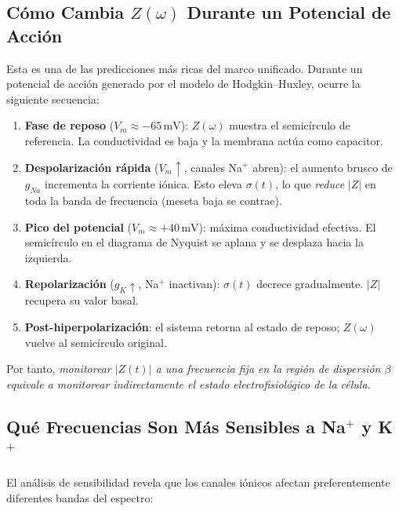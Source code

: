 \documentclass[12pt]{article}
\begin{document}
\subsection{C\'omo Cambia $Z(\omega)$ Durante un Potencial de Acci\'on}

Esta es una de las predicciones m\'as ricas del marco unificado. Durante un potencial de
acci\'on generado por el modelo de Hodgkin--Huxley, ocurre la siguiente secuencia:

\begin{enumerate}
\item \textbf{Fase de reposo} ($V_m \approx -65\,\text{mV}$): $Z(\omega)$ muestra el
semic\'irculo de referencia. La conductividad es baja y la membrana act\'ua como capacitor.
\item \textbf{Despolarizaci\'on r\'apida} ($V_m \uparrow$, canales Na$^+$ abren): el aumento
brusco de $g_{Na}$ incrementa la corriente i\'onica. Esto eleva $\sigma(t)$, lo que
\emph{reduce} $|Z|$ en toda la banda de frecuencia (meseta baja se contrae).
\item \textbf{Pico del potencial} ($V_m \approx +40\,\text{mV}$): m\'axima conductividad
efectiva. El semic\'irculo en el diagrama de Nyquist se aplana y se desplaza hacia la
izquierda.
\item \textbf{Repolarizaci\'on} ($g_K \uparrow$, Na$^+$ inactivan): $\sigma(t)$ decrece
gradualmente. $|Z|$ recupera su valor basal.
\item \textbf{Post-hiperpolarizaci\'on}: el sistema retorna al estado de reposo; $Z(\omega)$
vuelve al semic\'irculo original.
\end{enumerate}

Por tanto, \emph{monitorear $|Z(t)|$ a una frecuencia fija en la regi\'on de dispersi\'on $\beta$
equivale a monitorear indirectamente el estado electrofisiol\'ogico de la c\'elula.}

\subsection{Qu\'e Frecuencias Son M\'as Sensibles a Na$^+$ y K$^+$}

El an\'alisis de sensibilidad revela que los canales i\'onicos afectan preferentemente
diferentes bandas del espectro:
\end{document}
